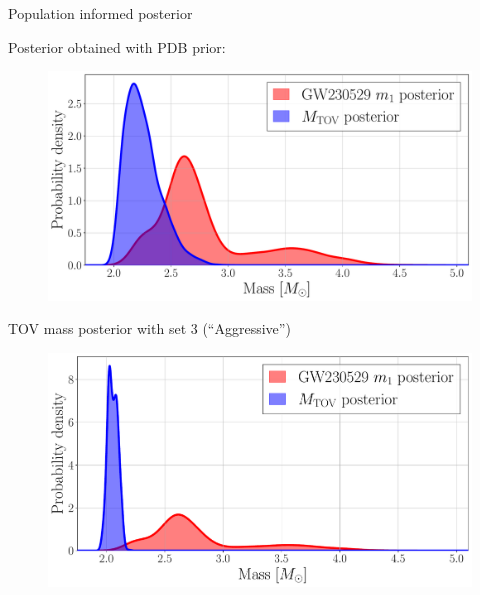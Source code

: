 \documentclass[usenames,dvipsnames,t]{beamer}
\begin{document}
\begin{frame}{Population informed posterior}

  Posterior obtained with \textsc{PDB} prior:
  \begin{figure}
    \centering
    \includegraphics[width=0.9\linewidth]{Figures/mtov_gw230529_set_L1_pdb.pdf}
  \end{figure}    

\end{frame}

\begin{frame}{TOV mass posterior with set 3 (``Aggressive'')}

  \begin{figure}
    \centering
    \includegraphics[width=0.75\linewidth]{Figures/mtov_gw230529_set_L3_pdb.pdf}
  \end{figure}

\end{frame}

\end{document}
